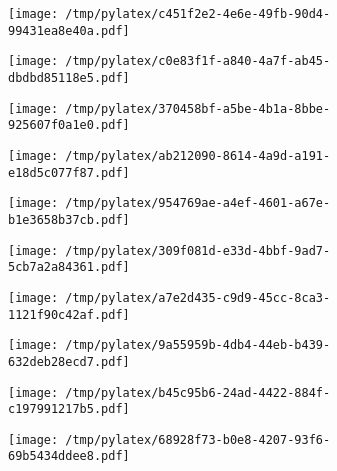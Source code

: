 \documentclass{article}
\begin{document}
\begin{figure}[htbp]
\begin{subfigure}[b]{.3\linewidth}
\texttt{[image: /tmp/pylatex/c451f2e2-4e6e-49fb-90d4-99431ea8e40a.pdf]}
\end{subfigure}
\begin{subfigure}[b]{.3\linewidth}
\texttt{[image: /tmp/pylatex/c0e83f1f-a840-4a7f-ab45-dbdbd85118e5.pdf]}
\end{subfigure}
\begin{subfigure}[b]{.3\linewidth}
\texttt{[image: /tmp/pylatex/370458bf-a5be-4b1a-8bbe-925607f0a1e0.pdf]}
\end{subfigure}
\begin{subfigure}[b]{.3\linewidth}
\texttt{[image: /tmp/pylatex/ab212090-8614-4a9d-a191-e18d5c077f87.pdf]}
\end{subfigure}
\begin{subfigure}[b]{.3\linewidth}
\texttt{[image: /tmp/pylatex/954769ae-a4ef-4601-a67e-b1e3658b37cb.pdf]}
\end{subfigure}
\begin{subfigure}[b]{.3\linewidth}
\texttt{[image: /tmp/pylatex/309f081d-e33d-4bbf-9ad7-5cb7a2a84361.pdf]}
\end{subfigure}
\begin{subfigure}[b]{.3\linewidth}
\texttt{[image: /tmp/pylatex/a7e2d435-c9d9-45cc-8ca3-1121f90c42af.pdf]}
\end{subfigure}
\begin{subfigure}[b]{.3\linewidth}
\texttt{[image: /tmp/pylatex/9a55959b-4db4-44eb-b439-632deb28ecd7.pdf]}
\end{subfigure}
\begin{subfigure}[b]{.3\linewidth}
\texttt{[image: /tmp/pylatex/b45c95b6-24ad-4422-884f-c197991217b5.pdf]}
\end{subfigure}
\begin{subfigure}[b]{.3\linewidth}
\texttt{[image: /tmp/pylatex/68928f73-b0e8-4207-93f6-69b5434ddee8.pdf]}
\end{subfigure}
\end{figure}
\end{document}
